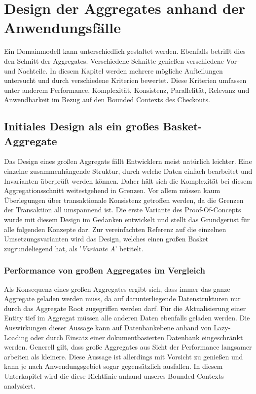 \chapter{Design der Aggregates anhand der Anwendungsfälle}

Ein Domainmodell kann unterschiedlich gestaltet werden. Ebenfalls betrifft dies den Schnitt der Aggregates. Verschiedene Schnitte genießen verschiedene Vor- und Nachteile. In diesem Kapitel werden mehrere mögliche Aufteilungen untersucht und durch verschiedene Kriterien bewertet. Diese Kriterien umfassen unter anderem Performance, Komplexität, Konsistenz, Parallelität, Relevanz und Anwendbarkeit im Bezug auf den Bounded Contexts des Checkouts.

\section{Initiales Design als ein großes Basket-Aggregate}

Das Design eines großen Aggregats fällt Entwicklern meist natürlich leichter. Eine einzelne zusammenhängende Struktur, durch welche Daten einfach bearbeitet und Invarianten überprüft werden können. Daher hält sich die Komplexität bei diesem Aggregationsschnitt weitestgehend in Grenzen. Vor allem müssen kaum Überlegungen über transaktionale Konsistenz getroffen werden, da die Grenzen der Transaktion all umspannend ist. Die erste Variante des Proof-Of-Concepts wurde mit diesem Design im Gedanken entwickelt und stellt das Grundgerüst für alle folgenden Konzepte dar. Zur vereinfachten Referenz auf die einzelnen Umsetzungsvarianten wird das Design, welches einen großen Basket zugrundeliegend hat, als '\emph{Variante A}' betitelt.


\subsection{Performance von großen Aggregates im Vergleich}

Als Konsequenz eines großen Aggregates ergibt sich, dass immer das ganze Aggregate geladen werden muss, da auf darunterliegende Datenstrukturen nur durch das Aggregate Root zugegriffen werden darf. Für die Aktualisierung einer Entity tief im Aggregat müssen alle anderen Daten ebenfalls geladen werden. Die Auswirkungen dieser Aussage kann auf Datenbankebene anhand von Lazy-Loading oder durch Einsatz einer dokumentbasierten Datenbank eingeschränkt werden. Generell gilt, dass große Aggregates aus Sicht der Performance langsamer arbeiten als kleinere. Diese Aussage ist allerdings mit Vorsicht zu genießen und kann je nach Anwendungsgebiet sogar gegensätzlich ausfallen. In diesem Unterkapitel wird die diese Richtlinie anhand unseres Bounded Contexts analysiert.

